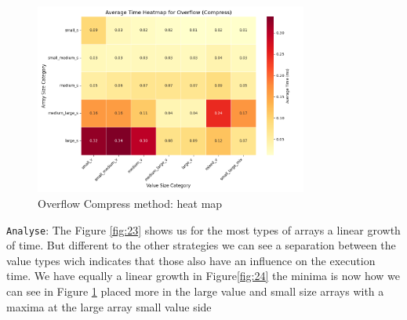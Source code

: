 \documentclass[11pt, a4paper]{article}
\begin{document}
	\begin{figure}[H]%
		\centering
		\includegraphics[width=0.8\textwidth]{Grafics/Overflow/OverflowCompressHeat.png}
		\caption{Overflow Compress method: heat map}
		\label{fig:25}
	\end{figure}
	\texttt{Analyse}: The Figure \ref{fig:23} shows us for the most types of arrays a linear growth of time. But different to the other strategies we can see a separation between the value types wich indicates that those also have an influence on the execution time. We have equally a linear growth in Figure\ref{fig:24} the minima is now how we can see in Figure \ref{fig:25} placed more in the large value and small size arrays with a maxima at the large array small value side 
	\par %
	
	
\end{document}
